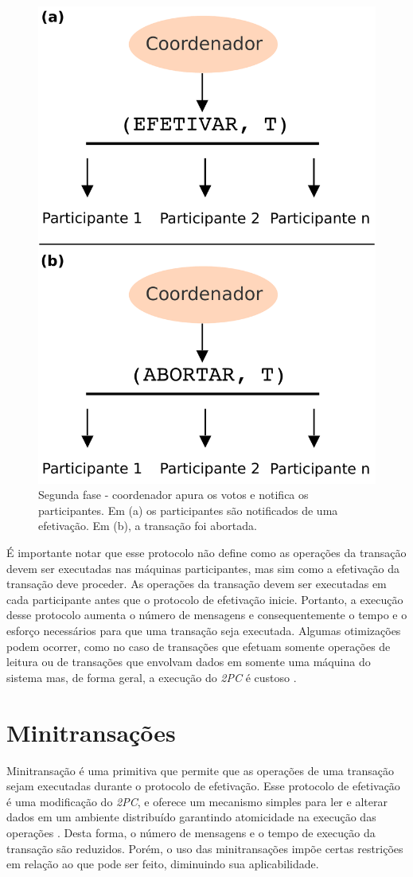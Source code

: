 \documentclass[11pt,twoside,a4paper]{book}
\begin{document}
\begin{figure}
  \centering
  \includegraphics[width=.40\textwidth]{2PC_2fase} 
  \caption{Segunda fase - coordenador apura os votos e notifica os participantes. Em (a) os participantes são notificados de uma efetivação. Em (b), a transação foi abortada.}
  \label{fig:2PC_2fase} 
\end{figure}

É importante notar que esse protocolo não define como as operações da transação devem ser executadas nas máquinas participantes, mas sim como a efetivação da transação deve proceder. As operações da transação devem ser executadas em cada participante antes que o protocolo de efetivação inicie. Portanto, a execução desse protocolo aumenta o número de mensagens e consequentemente o tempo e o esforço necessários para que uma transação seja executada. Algumas otimizações podem ocorrer, como no caso de transações que efetuam somente operações de leitura ou de transações que envolvam dados em somente uma máquina do sistema mas, de forma geral, a execução do \emph{2PC} é custoso \cite{gray-lamport}.

\section{Minitransações}
\label{sec:minitransacoes}
Minitransação é uma primitiva que permite que as operações de uma transação sejam executadas durante o protocolo de efetivação. Esse protocolo de efetivação é uma modificação do \emph{2PC}, e oferece um mecanismo simples para ler e alterar dados em um ambiente distribuído garantindo atomicidade na execução das operações \cite{sinfonia}. Desta forma, o número de mensagens e o tempo de execução da transação são reduzidos. Porém, o uso das minitransações impõe certas restrições em relação ao que pode ser feito, diminuindo sua aplicabilidade.
\end{document}

